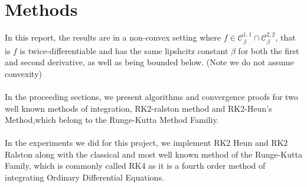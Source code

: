 \section{Methods}
In this report, the results are in a non-convex setting where $f \in \mathcal{C}_{\beta}^{1,1} \cap \mathcal{C}_{\beta}^{2,2}$, that is $f$ is twice-differentiable and has the same lipshcitz constant $\beta$ for both the first and second derivative, as well as being bounded below. (Note we do not assume convexity)
\\
\\
In the proceeding sections, we present algorithms and convergence proofs for two well known methods of integration, RK2-ralston method and RK2-Heun's Method,which belong to the Runge-Kutta Method Familiy.
\\
\\
In the experiments we did for this project, we implement RK2 Heun and RK2 Ralston along with the classical and most well known method of the Runge-Kutta Family, which is commonly called RK4 as it is a fourth order method of integrating Ordinary Differential Equations.
